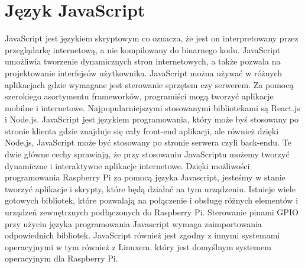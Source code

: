 \section{Język JavaScript}
JavaScript jest językiem skryptowym co oznacza, że jest on interpretowany przez przeglądarkę internetową, a nie kompilowany do binarnego kodu. JavaScript umożliwia tworzenie dynamicznych stron internetowych, a także pozwala na projektowanie interfejsów użytkownika. JavaScript można używać w różnych aplikacjach gdzie wymagane jest sterowanie sprzętem czy serwerem. Za pomocą szerokiego asortymentu frameworków, programiści mogą tworzyć aplikacje mobilne i internetowe. Najpopularniejszymi stosowanymi bibliotekami są React.js i Node.js. JavaScript jest językiem programowania, który może byś stosowany po stronie klienta gdzie znajduje się cały front-end aplikacji, ale również dzięki Node.js, JavaScript może być stosowany po stronie serwera czyli back-endu. Te dwie główne cechy sprawiają, że przy stosowaniu JavaScriptu możemy tworzyć dynamiczne i interaktywne aplikacje internetowe. Dzięki możliwości programowania Raspberry Pi za pomocą języka Javascript, jesteśmy w stanie tworzyć aplikacje i skrypty, które będą działać na tym urządzeniu. Istnieje wiele gotowych bibliotek, które pozwalają na połączenie i obsługę różnych elementów i urządzeń zewnętrznych podłączonych do Raspberry Pi. Sterowanie pinami GPIO przy użyciu języka programowania Javascript wymaga zaimportowania odpowiednich bibliotek. JavaScript również jest zgodny z innymi systemami operacyjnymi w tym również z Linuxem, który jest domyślnym systemem operacyjnym dla Raspberry Pi.

